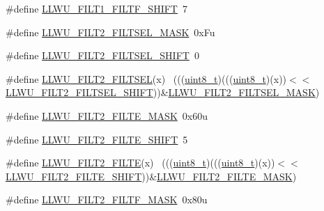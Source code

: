 \begin{DoxyCompactItemize}
\item 
\#define \hyperlink{group___l_l_w_u___register___masks_ga359dd7a99c209dc7c2f26d79c061d11e}{L\+L\+W\+U\+\_\+\+F\+I\+L\+T1\+\_\+\+F\+I\+L\+T\+F\+\_\+\+S\+H\+I\+FT}~7
\item 
\#define \hyperlink{group___l_l_w_u___register___masks_gae610069172bf4a4b8f783d54faf97496}{L\+L\+W\+U\+\_\+\+F\+I\+L\+T2\+\_\+\+F\+I\+L\+T\+S\+E\+L\+\_\+\+M\+A\+SK}~0x\+Fu
\item 
\#define \hyperlink{group___l_l_w_u___register___masks_ga4589e4982f58847b133e9792fac931ac}{L\+L\+W\+U\+\_\+\+F\+I\+L\+T2\+\_\+\+F\+I\+L\+T\+S\+E\+L\+\_\+\+S\+H\+I\+FT}~0
\item 
\#define \hyperlink{group___l_l_w_u___register___masks_gad00e71efa7367646814288da10459226}{L\+L\+W\+U\+\_\+\+F\+I\+L\+T2\+\_\+\+F\+I\+L\+T\+S\+EL}(x)                                    ~(((\hyperlink{_p_e___types_8h_aba7bc1797add20fe3efdf37ced1182c5}{uint8\+\_\+t})(((\hyperlink{_p_e___types_8h_aba7bc1797add20fe3efdf37ced1182c5}{uint8\+\_\+t})(x))$<$$<$\hyperlink{group___l_l_w_u___register___masks_ga4589e4982f58847b133e9792fac931ac}{L\+L\+W\+U\+\_\+\+F\+I\+L\+T2\+\_\+\+F\+I\+L\+T\+S\+E\+L\+\_\+\+S\+H\+I\+FT}))\&\hyperlink{group___l_l_w_u___register___masks_gae610069172bf4a4b8f783d54faf97496}{L\+L\+W\+U\+\_\+\+F\+I\+L\+T2\+\_\+\+F\+I\+L\+T\+S\+E\+L\+\_\+\+M\+A\+SK})
\item 
\#define \hyperlink{group___l_l_w_u___register___masks_ga6c6d4145e30bdb324bc6b137b2f7aada}{L\+L\+W\+U\+\_\+\+F\+I\+L\+T2\+\_\+\+F\+I\+L\+T\+E\+\_\+\+M\+A\+SK}~0x60u
\item 
\#define \hyperlink{group___l_l_w_u___register___masks_gac309ec1ef795572d048b09ac35847bf1}{L\+L\+W\+U\+\_\+\+F\+I\+L\+T2\+\_\+\+F\+I\+L\+T\+E\+\_\+\+S\+H\+I\+FT}~5
\item 
\#define \hyperlink{group___l_l_w_u___register___masks_ga990b42fa221f70b52fb360e95f86ccd4}{L\+L\+W\+U\+\_\+\+F\+I\+L\+T2\+\_\+\+F\+I\+L\+TE}(x)                                        ~(((\hyperlink{_p_e___types_8h_aba7bc1797add20fe3efdf37ced1182c5}{uint8\+\_\+t})(((\hyperlink{_p_e___types_8h_aba7bc1797add20fe3efdf37ced1182c5}{uint8\+\_\+t})(x))$<$$<$\hyperlink{group___l_l_w_u___register___masks_gac309ec1ef795572d048b09ac35847bf1}{L\+L\+W\+U\+\_\+\+F\+I\+L\+T2\+\_\+\+F\+I\+L\+T\+E\+\_\+\+S\+H\+I\+FT}))\&\hyperlink{group___l_l_w_u___register___masks_ga6c6d4145e30bdb324bc6b137b2f7aada}{L\+L\+W\+U\+\_\+\+F\+I\+L\+T2\+\_\+\+F\+I\+L\+T\+E\+\_\+\+M\+A\+SK})
\item 
\#define \hyperlink{group___l_l_w_u___register___masks_gab60be1393d84433fe44d4b332a77537c}{L\+L\+W\+U\+\_\+\+F\+I\+L\+T2\+\_\+\+F\+I\+L\+T\+F\+\_\+\+M\+A\+SK}~0x80u

\end{DoxyCompactItemize}
